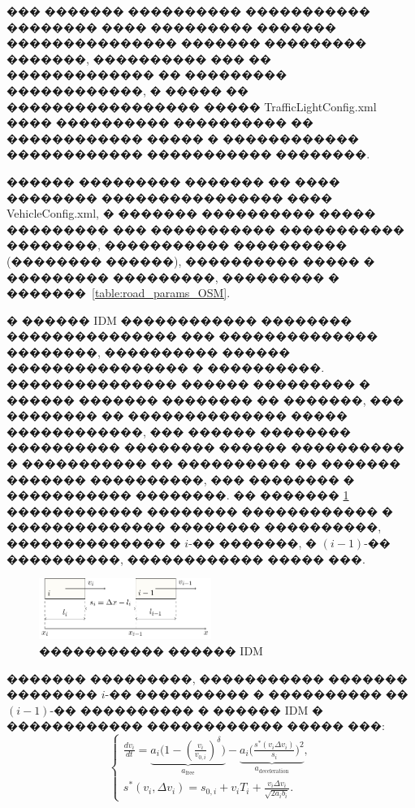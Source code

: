 \documentclass[11pt]{ubs}
\begin{document}
��� ������� ���������� ����������� �������� ���� ���������  ������� ��������������� ������� ��������� �������, ���������� ��� �� ������������� �� ��������� ������������, � ����� �� ����������������� ����� {TrafficLightConfig.xml} ���� ���������� ���������� �� ������������ ����� � ������������ ������������ ����������� ��������.

������ ��������� ������� ��  ���� �������� ���������������� ����  {VehicleConfig.xml}, � ������� ���������� ����� ��������� ��� ����������� ����������� ��������, ����������� ���������� (�������� ������),  ���������� ����� � ��������� ���������, ��������� � �������~\ref{table:road_params_OSM}.

� ������ IDM\cite{IDM} ������������  �������� ��������������� ��� �������������� ��������,  ���������� ������ ���������������� � ����������.
��������������� ������ ��������� � ������ ������� �������� �� �������,  ��� �������� �� �������������� ����� ������������, ��� ������ �������� ���������� �������� ������ ���������� � ����������� �� ���������� �� ������� ������� ����������, ��� �����\-��� � ����������� �����\-���.
�� ������� \ref{fig:IDM_illustration} ������������ �������� ������������ � �������������� �������� ����������, �������������� � $i$-��  �������, � $(i-1)$-�� ����������, ������������ ����� ���.
\begin{figure}[tbph]
  \centering
  \includegraphics[width = 0.5\textwidth]{sim_descr.pdf}
  \caption{����������� ������ IDM}\label{fig:IDM_illustration}
\end{figure}

������� ���������, ����������� ������� ��������  $i$-�� ����������  � ���������� �� $(i-1)$-�� ���������� � ������ IDM � ������������ ������������ ����� ���:
\begin{equation} \label{eq:IDM_sys}
  \left\{
  \begin{array}{l}
    \displaystyle   \frac{dv_i}{dt}=
    \underbrace{a_i\Biggl( 1-\left(\frac{v_i}{v_{0,i}}\right)^\delta\Biggr)}_{\displaystyle a_{\mathrm{free}}}-
    \underbrace{a_i\Biggl( \frac{s^*\left(v_i\Delta v_i\right)}{s_i}\Biggr)^2}_{\displaystyle a_{\mathrm{deceleration}}}, \\
    \displaystyle
    s^*\left(v_i, \Delta v_i\right)=s_{0,i}+v_iT_i+\frac{v_i\Delta v_i}{\sqrt{2a_ib_i}}.
  \end{array}\right.
\end{equation}
\end{document}

